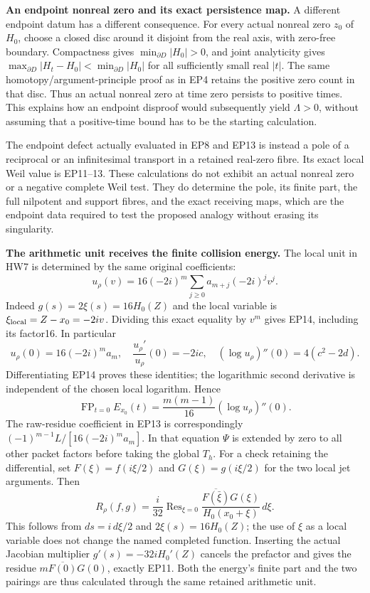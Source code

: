 \EP\textbf{An endpoint nonreal zero and its exact persistence map.}
A different endpoint datum has a different consequence. For every
actual nonreal zero $z_0$ of $H_0$, choose a closed disc around it
disjoint from the real axis, with zero-free boundary. Compactness
gives $\min_{\partial D}|H_0|>0$, and joint analyticity gives
$\max_{\partial D}|H_t-H_0|<\min_{\partial D}|H_0|$ for all
sufficiently small real $|t|$. The same homotopy/argument-principle
proof as in EP4 retains the positive zero count in that disc.
Thus an actual nonreal zero at time zero persists to positive
times. This explains how an endpoint disproof would subsequently
yield $\Lambda>0$, without assuming that a positive-time bound
has to be the starting calculation.

The endpoint defect actually evaluated in EP8 and EP13 is instead
a pole of a reciprocal or an infinitesimal transport in a retained
real-zero fibre. Its exact local Weil value is EP11--13. These
calculations do not exhibit an actual nonreal zero or a negative
complete Weil test. They do determine the pole, its finite part,
the full nilpotent and support fibres, and the exact receiving
maps, which are the endpoint data required to test the proposed
analogy without erasing its singularity.

\EP\textbf{The arithmetic unit receives the finite collision energy.}
The local unit in HW7 is determined by the same original coefficients:
\[
 u_\rho(v)=16(-2i)^m\sum_{j\ge0}a_{m+j}(-2i)^jv^j.
 \tag{EP14}\label{ep:unit}
\]
Indeed $g(s)=2\xi(s)=16H_0(Z)$ and the local variable is
$\xi_{\rm local}=Z-x_0=-2iv$.
Dividing this exact equality by $v^m$ gives EP14, including its factor16.
In particular
\[
 u_\rho(0)=16(-2i)^ma_m,\quad
 \frac{u_\rho'}{u_\rho}(0)=-2ic,\quad
 (\log u_\rho)''(0)=4(c^2-2d).
 \tag{EP15}
\]
Differentiating EP14 proves these identities; the logarithmic second
derivative is independent of the chosen local logarithm. Hence
\[
 \operatorname{FP}_{t=0}E_{x_0}(t)
        =\frac{m(m-1)}{16}(\log u_\rho)''(0).
 \tag{EP16}
\]
The raw-residue coefficient in EP13 is correspondingly
$(-1)^{m-1}L/[16(-2i)^ma_m]$. In that equation $\Psi$ is extended
by zero to all other packet factors before taking the global $T_h$.
For a check retaining the differential, set
$F(\xi)=f(i\xi/2)$ and $G(\xi)=g(i\xi/2)$ for the two local jet
arguments. Then
\[
 R_\rho(f,g)=\frac{i}{32}\operatorname{Res}_{\xi=0}
     \frac{\overline{F(\bar\xi)}G(\xi)}{H_0(x_0+\xi)}\,d\xi.
 \tag{EP17}
\]
This follows from $ds=i\,d\xi/2$ and $2\xi(s)=16H_0(Z)$;
the use of $\xi$ as a local variable does not change the named
completed function. Inserting the actual Jacobian multiplier
$g'(s)=-32iH_0'(Z)$ cancels the prefactor and gives the residue
$m\overline{F(0)}G(0)$, exactly EP11. Both the energy's finite
part and the two pairings are thus calculated through the same
retained arithmetic unit.

